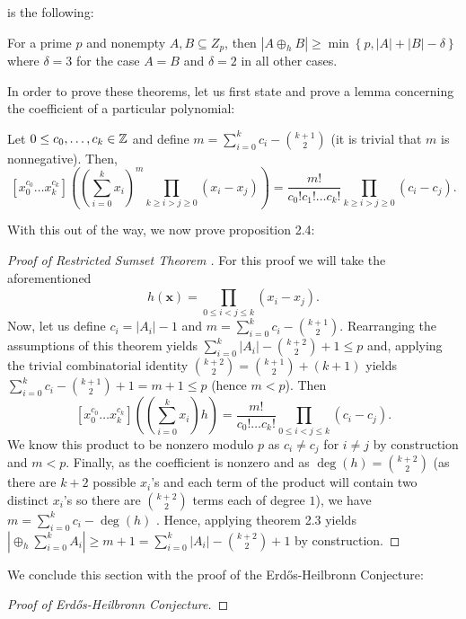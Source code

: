 		is the following: \begin{theorem}
			For a prime $p$ and nonempty $A,B \subseteq Z_{p}$,
			then $\left| A \oplus_{h} B \right| \ge \min \left\{ p,
			\left| A \right|  + \left| B \right|  - \delta \right\}
			$ where $\delta = 3$ for  the case $A = B$ and $\delta
			= 2$ in all other cases.  \end{theorem} In order to
			prove these theorems, let us first state and prove a
			lemma concerning the coefficient of a particular
			polynomial: \begin{lemma}[] Let $0 \le c_0, \ldots,
				c_{k} \in \mathbb{Z}$ and define $m = \sum_{i=0}^{k}
				c_{i} - \binom{k+1}{2}$ (it is trivial that $m$
				is nonnegative). Then,\[[x_0^{c_0}\ldots
				x_{k}^{c_{k}}] \left( \left( \sum_{i=0}^{k}
			x_{i} \right) ^{m} \prod_{k \ge i > j \ge 0}^{} \left(
x_{i} - x_{j} \right)  \right) = \frac{m!}{c_0! c_1! \ldots c_{k}!} \prod_{k
\ge i > j \ge 0}^{} \left( c_{i} - c_{j} \right).\] \end{lemma}  With this out of the way,
we now prove proposition 2.4: \begin{proof}[Proof of Restricted Sumset Theorem ]
	For this proof we will take the aforementioned \[ h\left( \textbf{x}
		\right) = \prod_{0\le i < j \le k}^{} \left( x_{i} - x_{j}
	\right) .\] Now, let us define $c_{i} = \left| A_{i} \right|  -1$ and
	$m = \sum_{i=0}^{k} c_{i} - \binom{k+1}{2}$. Rearranging the
	assumptions of this theorem yields $\sum_{i=0}^{k} \left| A_{i} \right|
	- \binom{k+2}{2} + 1 \le p$ and, applying the trivial combinatorial
	identity $\binom{k+2}{2} =  \binom{k+1}{2} +  (k+1)$ yields \\
	$\sum_{i=0}^{k} c_{i} - \binom{k+1}{2} + 1 = m + 1 \le p$ (hence $m <
	p$). Then  \[ [x_0^{c_0}\ldots x_{k}^{c_{k}}]\left( \left(
	\sum_{i=0}^{k} x_{i} \right) h \right) =  \frac{m!}{c_0! \ldots
	c_{k}!}\prod_{0 \le i < j \le k}^{} \left( c_{i} - c_{j} \right) .\] We
	know this product to be nonzero modulo  $p$ as  $c_{i} \neq c_{j}$  for
	$i \neq j$ by construction and $m < p$. Finally, as the coefficient is
	nonzero and as $\deg \left( h \right) =  \binom{k+2}{2}$ (as there are
	$k+2$ possible $x_{i}$'s and each term of the product will contain two
	distinct $x_{i}$'s so there are $\binom{k+2}{2}$ terms each of degree
	$1$), we have $m = \sum_{i=0}^{k} c_{i} - \deg \left( h \right)$
	. Hence, applying theorem 2.3 yields  $\left|
	\oplus _h \sum_{i= 0}^{k}  A_i \right| \ge m + 1 = \sum_{i=0}^{k}
	\left| A_{i} \right| - \binom{k+2}{2}+1$ by construction.  \end{proof}
We conclude this section with the proof of the Erdős-Heilbronn Conjecture:
\begin{proof}[Proof of Erdős-Heilbronn Conjecture]
\end{proof}
